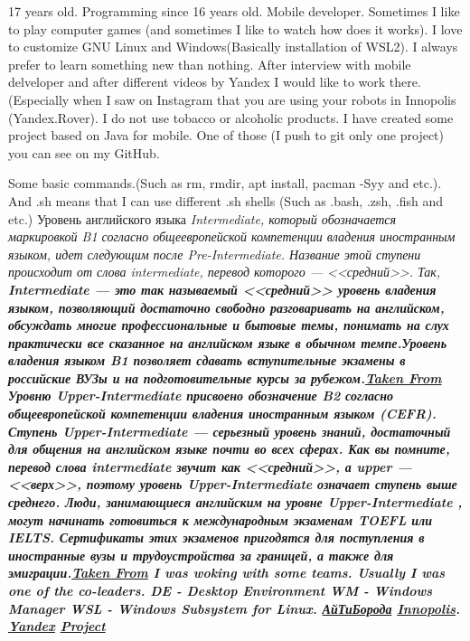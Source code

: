 \documentclass[a4paper, 12pt]{article}
\begin{document}
	17 years old. Programming since 16 years old. Mobile developer. Sometimes I like to play computer games (and sometimes I like to watch how does it works). I love to customize GNU Linux and Windows(Basically installation of WSL2\cite{WSL}). I always prefer to learn something new than nothing. After interview with mobile delveloper\cite{IT-Beard} and after different videos by Yandex I would like to work there.(Especially when I saw on Instagram that you are using your robots in Innopolis (Yandex.Rover)\cite{Rover}. I do not use tobacco or alcoholic products. I have created some project based on Java for mobile. One of those (I push to git only one project) you can see on my GitHub\cite{GitHub}.
	\footnotesize
	\begin{thebibliography}{9}
		Some basic commands.(Such as rm, rmdir, apt install, pacman -Syy and etc.). And .sh means that I can use different .sh shells (Such as .bash, .zsh, .fish and etc.)
		Уровень английского языка \it Intermediate\rm, который обозначается маркировкой B1 согласно общеевропейской компетенции владения иностранным языком, идет следующим после \it Pre-Intermediate\rm. Название этой ступени происходит от слова intermediate, перевод которого — <<средний>>. Так, \bf Intermediate — это так называемый <<средний>> уровень владения языком, позволяющий достаточно свободно разговаривать на английском, обсуждать многие профессиональные и бытовые темы, понимать на слух практически все сказанное на английском языке в обычном темпе.\rm Уровень владения языком B1 позволяет сдавать вступительные экзамены в российские ВУЗы и на подготовительные курсы за рубежом.\href{https://englex.ru/level-intermediate/}{\bf Taken From}
		Уровню \it Upper-Intermediate \rm присвоено обозначение B2 согласно общеевропейской компетенции владения иностранным языком (CEFR). Ступень \it Upper-Intermediate \rm — серьезный уровень знаний, достаточный для общения на английском языке почти во всех сферах. Как вы помните, перевод слова \it intermediate \it звучит как <<средний>>, а upper — <<верх>>, поэтому уровень \it Upper-Intermediate \rm означает ступень выше среднего. Люди, занимающиеся английским на уровне \it Upper-Intermediate \rm , могут начинать готовиться к международным экзаменам \it TOEFL \rm или \it IELTS\rm. Сертификаты этих экзаменов пригодятся для поступления в иностранные вузы и трудоустройства за границей, а также для эмиграции.\href{https://englex.ru/level-upper-intermediate}{\bf Taken From}
		I was woking with some teams. Usually I was one of the co-leaders.
		DE - Desktop Environment
		WM - Windows Manager
		WSL - Windows Subsystem for Linux.
		\href{https://www.youtube.com/watch?v=j9zlTFLLrSI}{АйТиБорода}
		\href{https://www.instagram.com/p/CIkkBixFaiq/?utm_source=ig_web_copy_link}{Innopolis}. \href{https://www.instagram.com/p/CMCSzacls9b/?utm_source=ig_web_copy_link}{Yandex}
		\href{https://github.com/AndreyVAAVA/Modeling_of_AP-SQLite_Beta/tree/master}{Project}
	\end{thebibliography}
\end{document}
